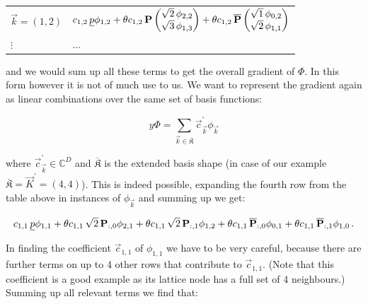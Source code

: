 \begin{center}
\begin{tabular}{ll}
$\vec{k} = (1,2)$ & $c_{1,2} \, \underline{p} \phi_{1,2} +
                     \theta c_{1,2} \, \mathbf{P} \begin{pmatrix} \sqrt{2} \, \phi_{2,2} \\
                                                               \sqrt{3} \, \phi_{1,3}
                                               \end{pmatrix} +
                     \theta c_{1,2} \, \overline{\mathbf{P}} \begin{pmatrix} \sqrt{1} \, \phi_{0,2} \\
                                                                      \sqrt{2} \, \phi_{1,1}
                                                      \end{pmatrix}$ \\
$\vdots$ & $\hdots$
\end{tabular}
\end{center}

and we would sum up all these terms to get the overall gradient of $\Phi$. In this form however
it is not of much use to us. We want to represent the gradient again as linear combinations
over the same set of basis functions:

\begin{equation} \label{eq:gradient_basis_expandion}
  y \Phi = \sum_{\vec{k} \in \overline{\mathfrak{K}}} \vec{c}^\prime_{\vec{k}} \phi_{\vec{k}}
\end{equation}

where $\vec{c}^\prime_{\vec{k}} \in \mathbb{C}^{D}$ and $\overline{\mathfrak{K}}$ is the
extended basis shape (in case of our example $\overline{\mathfrak{K}} = \vec{K}^\prime = (4,4)$).
This is indeed possible, expanding the fourth row from the table above in
instances of $\phi_{\vec{k}}$ and summing up we get:

\begin{equation*}
    c_{1,1} \, \underline{p} \phi_{1,1}
  + \theta c_{1,1} \, \sqrt{2} \, \mathbf{P}_{:,0} \phi_{2,1}
  + \theta c_{1,1} \, \sqrt{2} \, \mathbf{P}_{:,1} \phi_{1,2}
  + \theta c_{1,1} \, \overline{\mathbf{P}}_{:,0} \phi_{0,1}
  + \theta c_{1,1} \, \overline{\mathbf{P}}_{:,1} \phi_{1,0} \,.
\end{equation*}

In finding the coefficient $\vec{c}_{1,1}$ of $\phi_{1,1}$ we have to be very careful, because
there are further terms on up to 4 other rows that contribute to $\vec{c}_{1,1}$.
(Note that this coefficient is a good example as its lattice node has a full set
of 4 neighbours.) Summing up all relevant terms we find that:

